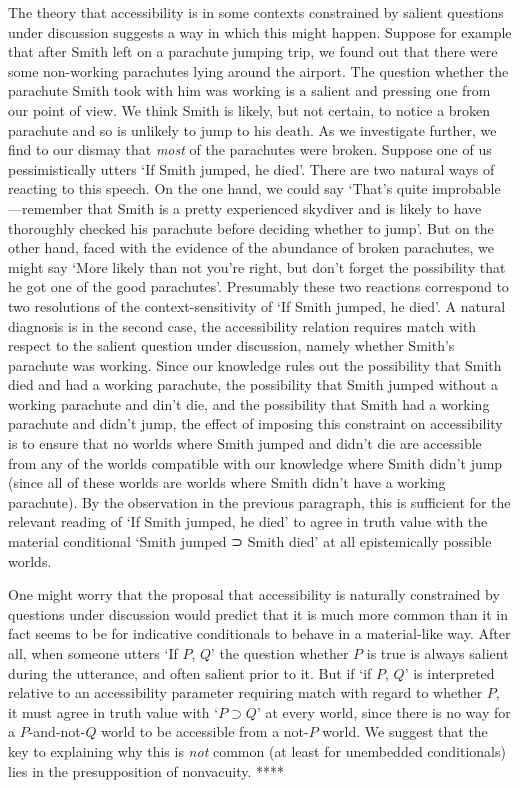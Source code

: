 \documentclass[If.tex]{subfiles}
\begin{document}
\begin{prop}
The theory that accessibility is in some contexts constrained by salient questions under discussion suggests a way in which this might happen.  Suppose for example that after Smith left on a parachute jumping trip, we found out that there were some non-working parachutes lying around the airport.  The question whether the parachute Smith took with him was working is a salient and pressing one from our point of view.  We think Smith is likely, but not certain, to notice a broken parachute and so is unlikely to jump to his death.  As we investigate further, we find to our dismay that \emph{most} of the parachutes were broken.  Suppose one of us pessimistically utters ‘If Smith jumped, he died’.  There are two natural ways of reacting to this speech.  On the one hand, we could say ‘That's quite improbable---remember that Smith is a pretty experienced skydiver and is likely to have thoroughly checked his parachute before deciding whether to jump’.  But on the other hand, faced with the evidence of the abundance of broken parachutes, we might say ‘More likely than not you're right, but don't forget the possibility that he got one of the good parachutes’.  Presumably these two reactions correspond to two resolutions of the context-sensitivity of ‘If Smith jumped, he died’.  A natural diagnosis is in the second case, the accessibility relation requires match with respect to the salient question under discussion, namely whether Smith's parachute was working.  Since our knowledge rules out the possibility that Smith died and had a working parachute, the possibility that Smith jumped without a working parachute and din't die, and the possibility that Smith had a working parachute and didn't jump, the effect of imposing this constraint on accessibility is to ensure that no worlds where Smith jumped and didn't die are accessible from any of the worlds compatible with our knowledge where Smith didn't jump (since all of these worlds are worlds where Smith didn't have a working parachute).  By the observation in the previous paragraph, this is sufficient for the relevant reading of ‘If Smith jumped, he died’ to agree in truth value with the material conditional ‘Smith jumped ⊃ Smith died’ at all epistemically possible worlds.  

One might worry that the proposal that accessibility is naturally constrained by questions under discussion would predict that it is much more common than it in fact seems to be for indicative conditionals to behave in a material-like way.  After all, when someone utters ‘If $P$, $Q$’ the question whether $P$ is true is always salient during the utterance, and often salient prior to it.  But if ‘if $P$, $Q$’ is interpreted relative to an accessibility parameter requiring match with regard to whether $P$, it must agree in truth value with ‘$P⊃Q$’ at every world, since there is no way for a $P$-and-not-$Q$ world to be accessible from a not-$P$ world.  We suggest that the key to explaining why this is \emph{not} common (at least for unembedded conditionals) lies in the presupposition of nonvacuity.  ****




\end{prop}
\end{document}
